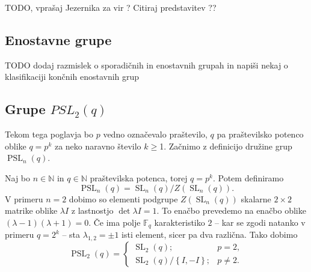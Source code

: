 \begin{trditev}
\label{trd_babaijeva_domneva}
 TODO, vprašaj Jezernika za vir ? Citiraj predstavitev ?? 
\end{trditev}

\subsection{Enostavne grupe}


TODO dodaj razmislek o sporadičnih in enostavnih grupah in napiši nekaj o klasifikaciji končnih enostavnih grup

\subsection{Grupe $PSL_2(q)$}\label{sec_grupe_psl2q}

Tekom tega poglavja bo $p$ vedno označevalo praštevilo, $q$ pa praštevilsko potenco oblike $q = p^{k}$ za neko naravno število $k \ge $1. Začnimo z definicijo družine grup $\operatorname{PSL}_n(q)$.

\begin{definicija}\label{def_pslnq_in_psl2q}
    Naj bo $n \in \mathbb{N}$ in $q \in \mathbb{N}$ praštevilska potenca, torej $q = p^{k}$. Potem definiramo \begin{equation*}
        \operatorname{PSL}_n(q) = {\operatorname{SL}_n(q)} / {Z(\operatorname{SL}_n(q))}.
     \end{equation*}   
    V primeru $n = 2$ dobimo so elementi podgrupe $Z(\operatorname{SL}_n(q))$ skalarne $2 \times 2$ matrike oblike $\lambda I$ z lastnostjo $\det \lambda I = 1$. To enačbo prevedemo na enačbo oblike $(\lambda - 1)(\lambda + 1) = 0$.
    Če ima polje $\mathbb{F}_q$ karakteristiko $2$ -- kar se zgodi natanko v primeru $q = 2^{k}$ -- sta $\lambda_{1,2} = \pm 1$ isti element, sicer pa dva različna. Tako dobimo
    \begin{equation*}
                \operatorname{PSL}_2(q) = \begin{cases}
                    \operatorname{SL}_2(q); & p = 2,  \\
                    {\operatorname{SL}_2(q)} / {\left\{ I, -I \right\} }; & p \neq 2.
                \end{cases}
             \end{equation*}   
    \end{definicija}
    
